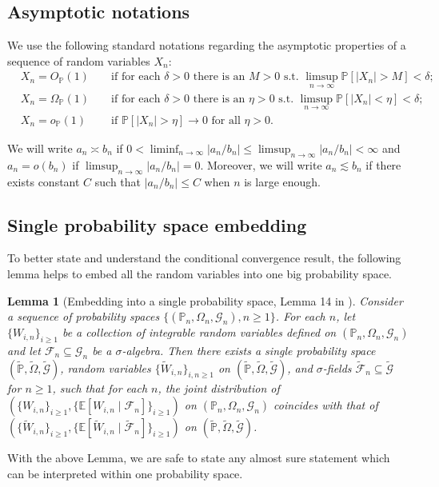 \documentclass[12pt]{article}
\newtheorem{lemma}{Lemma}
\theoremstyle{definition}
\def\P{\mathbb{P}}
\def\P{\mathbb{P}}
\newcommand{\E}{\mathbb E}								%
\renewcommand{\P}{\mathbb{P}}							%
\begin{document}
\subsection{Asymptotic notations}\label{sec:asymptotic-notations}

We use the following standard notations regarding the asymptotic properties of a sequence of random variables $X_n$:
\begin{align*}
	&X_n = O_{\P}(1) &&\text{ if for each } \delta > 0 \text{ there is an } M > 0 \text{ s.t. } \limsup_{n \rightarrow \infty}\P[|X_n| > M] < \delta; \\
	&X_n = \Omega_{\P}(1) &&\text{ if for each } \delta > 0 \text{ there is an } \eta > 0 \text{ s.t. } \limsup_{n \rightarrow \infty}\P[|X_n| < \eta] < \delta;\\
	&X_n = o_{\P}(1) &&\text{ if } \P[|X_n| > \eta] \rightarrow 0 \text{ for all } \eta > 0.
\end{align*}

We will write $a_n \asymp b_n$ if $0<\liminf_{n\rightarrow\infty}|a_n/b_n|\leq\limsup_{n\rightarrow\infty}|a_n/b_n|<\infty$ and $a_n=o(b_n)$ if $\limsup_{n\rightarrow\infty}|a_n/b_n|=0$. Moreover, we will write $a_n\lesssim b_n$ if there exists constant $C$ such that $|a_n/b_n|\leq C$ when $n$ is large enough.


\subsection{Single probability space embedding}
To better state and understand the conditional convergence result, the following lemma helps to embed all the random variables into one big probability space.

\begin{lemma}[Embedding into a single probability space, Lemma 14 in \cite{Niu2022a}]\label{lem:embedding}
	Consider a sequence of probability spaces $\{(\P_n,\Omega_n,\mathcal{G}_n),n \geq 1\}$. For each $n$, let $\{W_{i,n}\}_{i \geq 1}$ be a collection of integrable random variables defined on $(\P_n,\Omega_n,\mathcal{G}_n)$ and let $\mathcal F_n \subseteq \mathcal G_n$ be a $\sigma$-algebra. Then there exists a single probability space $(\widetilde{\P}, \widetilde{\Omega}, \widetilde{\mathcal G})$, random variables $\{\widetilde W_{i,n}\}_{i,n \geq 1}$ on $(\widetilde{\P}, \widetilde{\Omega}, \widetilde{\mathcal G})$, and $\sigma$-fields $\widetilde{\mathcal F}_n \subseteq \widetilde{\mathcal G}$ for $n \geq 1$, such that for each $n$, the joint distribution of $(\{W_{i,n}\}_{i \geq 1}, \{\E[W_{i,n}\mid\mathcal F_n]\}_{i \geq 1})$ on $(\P_n,\Omega_n,\mathcal{G}_n)$ coincides with that of $(\{\widetilde W_{i,n}\}_{i \geq 1}, \{\E[\widetilde W_{i,n}\mid \widetilde{\mathcal F}_n]\}_{i \geq 1})$ on $(\widetilde{\P}, \widetilde{\Omega}, \widetilde{\mathcal G})$.
\end{lemma}
\noindent With the above Lemma, we are safe to state any almost sure statement which can be interpreted within one probability space. 
\end{document}
